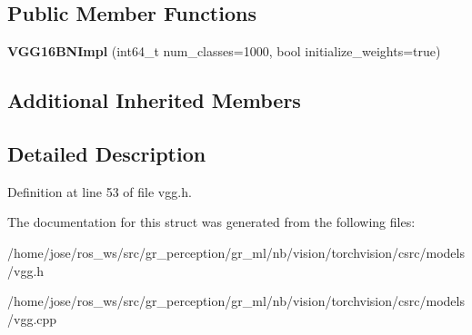 \subsection*{Public Member Functions}
\begin{DoxyCompactItemize}
\item 
\mbox{\label{structvision_1_1models_1_1VGG16BNImpl_a757dabf16881473e9499ab33c63ea638}} 
{\bfseries V\+G\+G16\+B\+N\+Impl} (int64\+\_\+t num\+\_\+classes=1000, bool initialize\+\_\+weights=true)
\end{DoxyCompactItemize}
\subsection*{Additional Inherited Members}


\subsection{Detailed Description}


Definition at line 53 of file vgg.\+h.



The documentation for this struct was generated from the following files\+:\begin{DoxyCompactItemize}
\item 
/home/jose/ros\+\_\+ws/src/gr\+\_\+perception/gr\+\_\+ml/nb/vision/torchvision/csrc/models/vgg.\+h\item 
/home/jose/ros\+\_\+ws/src/gr\+\_\+perception/gr\+\_\+ml/nb/vision/torchvision/csrc/models/vgg.\+cpp\end{DoxyCompactItemize}
